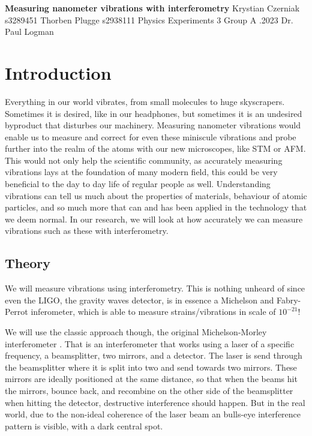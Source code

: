 \documentclass[a4paper,11pt]{article} %
\begin{document}
\textbf{Measuring nanometer vibrations with interferometry} \newline
Krystian Czerniak s3289451 \newline
Thorben Plugge s2938111 \newline
Physics Experiments 3 Group A .2023 \newline
Dr. Paul Logman

\section{Introduction} 
Everything in our world vibrates, from small molecules to huge skyscrapers. Sometimes it is desired, like in our headphones, but sometimes it is an undesired byproduct that disturbes our machinery. Measuring nanometer vibrations would enable us to measure and correct for even these miniscule vibrations and probe further into the realm of the atoms with our new microscopes, like STM or AFM. This would not only help the scientific community, as accurately measuring vibrations lays at the foundation of many modern field, this could be very beneficial to the day to day life of regular people as well. Understanding vibrations can tell us much about the properties of materials, behaviour of atomic particles, and so much more that can and has been applied in the technology that we deem normal. In our research, we will look at how accurately we can measure vibrations such as these with interferometry. 


\subsection{Theory}
We will measure vibrations using interferometry. This is nothing unheard of since even the LIGO, the gravity waves detector, is in essence a Michelson and Fabry-Perrot inferometer, which is able to measure strains/vibrations in scale of $10^{-21}$\cite{Review}! 

We will use the classic approach though, the original Michelson-Morley interferometer \cite{original}. That is an interferometer that works using a laser of a specific frequency, a beamsplitter, two mirrors, and a detector. The laser is send through the beamsplitter where it is split into two and send towards two mirrors. These mirrors are ideally positioned at the same distance, so that when the beams hit the mirrors, bounce back, and recombine on the other side of the beamsplitter when hitting the detector, destructive interference should happen. But in the real world, due to the non-ideal coherence of the laser beam an bulls-eye interference pattern is visible, with a dark central spot.
\end{document}

